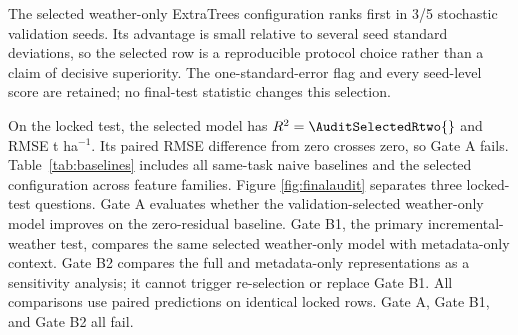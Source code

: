 \documentclass[conference]{IEEEtran}
\begin{document}
\begin{table}[t]
\centering
\caption{Validation selection on 2012--2015. RMSE is computed after fixed-seed
prediction aggregation; Seed SD is the across-seed RMSE standard deviation.}
\label{tab:selection}
\scriptsize
\resizebox{\columnwidth}{!}{}
\end{table}

The selected weather-only ExtraTrees configuration ranks first in 3/5 stochastic
validation seeds. Its advantage is small relative to several seed standard
deviations, so the selected row is a reproducible protocol choice rather than a
claim of decisive superiority. The one-standard-error flag and every seed-level
score are retained; no final-test statistic changes this selection.

\begin{table}[t]
\centering
\caption{Validation stability of the leading configurations. The rank probability
is across fixed stochastic seeds; 1-SE denotes inclusion under the pre-specified
one-standard-error diagnostic, not a post-hoc replacement.}
\label{tab:stability}
\scriptsize
\resizebox{\columnwidth}{!}{}
\end{table}

On the locked test, the selected model has $R^2=\AuditSelectedRtwo{}$ and RMSE
\AuditSelectedRMSE{} t ha$^{-1}$. Its paired RMSE difference from zero crosses
zero, so Gate A fails. Table~\ref{tab:baselines} includes all same-task naive
baselines and the selected configuration across feature families. Figure
\ref{fig:finalaudit} separates three locked-test questions. Gate A evaluates
whether the validation-selected weather-only model improves on the zero-residual
baseline. Gate B1, the primary incremental-weather test, compares the same
selected weather-only model with metadata-only context. Gate B2 compares the full
and metadata-only representations as a sensitivity analysis; it cannot trigger
re-selection or replace Gate B1. All comparisons use paired predictions on
identical locked rows. Gate A, Gate B1, and Gate B2 all fail.

\begin{table}[t]
\centering
\caption{Locked 2016--2025 same-task audit. Learned-model predictions are seed
aggregated. $\Delta$RMSE is model minus zero-residual RMSE with paired 95\%
year-block intervals; RMSE is t ha$^{-1}$.}
\label{tab:baselines}
\scriptsize
\resizebox{\textwidth}{!}{}
\end{table}
\end{document}
